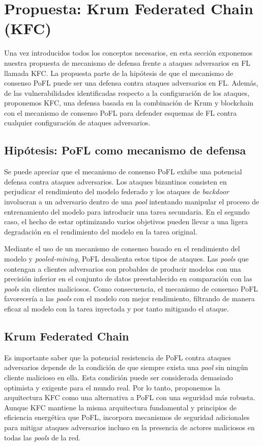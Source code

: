 \chapter{Propuesta: Krum Federated 
Chain (KFC)}\label{sec:propuesta}

Una vez introducidos todos los conceptos necesarios, en esta sección exponemos nuestra propuesta de mecanismo de defensa frente a ataques adversarios en \ac{FL} llamada \ac{KFC}. La propuesta parte de la hipótesis de que el mecanismo de consenso \ac{PoFL} puede ser una defensa contra ataques adversarios en \ac{FL}. Además, de las vulnerabilidades identificadas respecto a la configuración de los ataques, proponemos \ac{KFC}, una defensa basada en la combinación de Krum y blockchain con el mecanismo de consenso \ac{PoFL} para defender esquemas de \ac{FL} contra cualquier configuración de ataques adversarios.

\section{Hipótesis: PoFL como mecanismo de defensa}
Se puede apreciar que el mecanismo de consenso \ac{PoFL} exhibe una potencial defensa contra ataques adversarios. Los ataques bizantinos consisten en perjudicar el rendimiento del modelo federado y los ataques de \textit{backdoor} involucran a un adversario dentro de una \textit{pool} intentando manipular el proceso de entrenamiento del modelo para introducir una tarea secundaria. En el segundo caso, el hecho de estar optimizando varios objetivos pueden llevar a una ligera degradación en el rendimiento del modelo en la tarea original. 

Mediante el uso de un mecanismo de consenso basado en el rendimiento del modelo y \textit{pooled-mining}, \ac{PoFL} desalienta estos tipos de ataques. Las \textit{pools} que contengan a clientes adversarios son probables de producir modelos con una precisión inferior en el conjunto de datos preestablecido en comparación con las \textit{pools} sin clientes maliciosos. Como consecuencia, el mecanismo de consenso \ac{PoFL} favorecería a las \textit{pools} con el modelo con mejor rendimiento, filtrando de manera eficaz al modelo con la tarea inyectada y por tanto mitigando el ataque.

\section{Krum Federated Chain}

Es importante saber que la potencial resistencia de \ac{PoFL} contra ataques adversarios depende de la condición de que siempre exista una \textit{pool} sin ningún cliente malicioso en ella. Esta condición puede ser considerada demasiado optimista y exigente para el mundo real. Por lo tanto, proponemos la arquitectura \ac{KFC} como una alternativa a \ac{PoFL} con una seguridad más robusta. Aunque \ac{KFC} mantiene la misma arquitectura fundamental y principios de eficiencia energética que \ac{PoFL}, incorpora mecanismos de seguridad adicionales para mitigar ataques adversarios incluso en la presencia de actores maliciosos en todas las \textit{pools} de la red.

